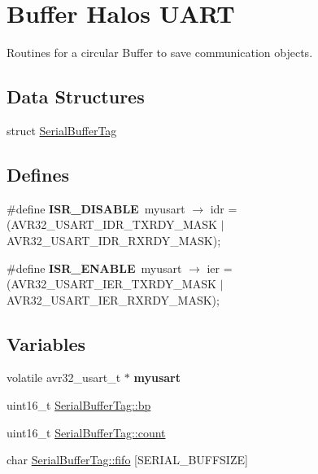 \hypertarget{group___serial}{
\section{Buffer Halos UART}
\label{group___serial}
}
Routines for a circular Buffer to save communication objects.  


\subsection*{Data Structures}
\begin{CompactItemize}
\item 
struct \hyperlink{struct_serial_buffer_tag}{SerialBufferTag}
\end{CompactItemize}
\subsection*{Defines}
\begin{CompactItemize}
\item 
\hypertarget{group___serial_g77469b64f193315fbae03a09c227df5e}{
\#define \textbf{ISR\_\-DISABLE}~myusart $\rightarrow$ idr = (AVR32\_\-USART\_\-IDR\_\-TXRDY\_\-MASK $|$ AVR32\_\-USART\_\-IDR\_\-RXRDY\_\-MASK);}
\label{group___serial_g77469b64f193315fbae03a09c227df5e}

\item 
\hypertarget{group___serial_g04c1c5bb7c5c1d23ef99dab3d530aa76}{
\#define \textbf{ISR\_\-ENABLE}~myusart $\rightarrow$ ier = (AVR32\_\-USART\_\-IER\_\-TXRDY\_\-MASK $|$ AVR32\_\-USART\_\-IER\_\-RXRDY\_\-MASK);}
\label{group___serial_g04c1c5bb7c5c1d23ef99dab3d530aa76}

\end{CompactItemize}
\subsection*{Variables}
\begin{CompactItemize}
\item 
\hypertarget{group___serial_g6dd5e0e639beaa7c61014c923478b465}{
volatile avr32\_\-usart\_\-t $\ast$ \textbf{myusart}}
\label{group___serial_g6dd5e0e639beaa7c61014c923478b465}

\item 
uint16\_\-t \hyperlink{group___serial_g80fec57b0c1089e49be601c8e154011f}{SerialBufferTag::bp}
\item 
uint16\_\-t \hyperlink{group___serial_gf764ad82a3af5651722c23326f28adbd}{SerialBufferTag::count}
\item 
char \hyperlink{group___serial_g0cbebf4bc14ed97a7d673795fccb8f26}{SerialBufferTag::fifo} \mbox{[}SERIAL\_\-BUFFSIZE\mbox{]}
\end{CompactItemize}
